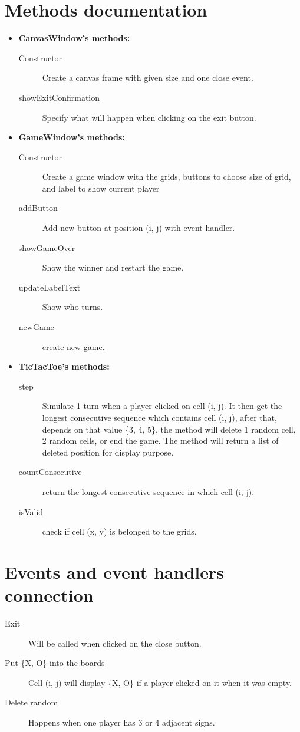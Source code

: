\documentclass[a4paper, 12pt]{report}
\begin{document}
\chapter{Methods documentation}
\begin{itemize}
\item \textbf{CanvasWindow's methods:}
		\begin{description}
			\item[Constructor] Create a canvas frame with given size and one close event.
			\item[showExitConfirmation] Specify what will happen when clicking on the exit button.
		\end{description}
\item \textbf{GameWindow's methods:}
		\begin{description}
			\item[Constructor] Create a game window with the grids, buttons to choose size of grid, and label to show current player
			\item[addButton] Add new button at position (i, j) with event handler.
			\item[showGameOver] Show the winner and restart the game.
			\item[updateLabelText] Show who turns.
			\item[newGame] create new game.
		\end{description}
\item \textbf{TicTacToe's methods:}
		\begin{description}
			\item[step] Simulate 1 turn when a player clicked on cell (i, j). It then get the longest consecutive sequence which contains cell (i, j), after that, depends on that value \{3, 4, 5\}, the method will delete 1 random cell, 2 random cells, or end the game. The method will return a list of deleted position for display purpose.
			\item[countConsecutive] return the longest consecutive sequence in which cell (i, j).
			\item[isValid] check if cell (x, y) is belonged to the grids.
		\end{description}
\end{itemize}
\chapter{Events and event handlers connection}
\begin{description}
	\item[Exit] Will be called when clicked on the close button.
	\item[Put \{X, O\} into the boards] Cell (i, j) will display \{X, O\} if a player clicked on it when it was empty.
	\item[Delete random] Happens when one player has 3 or 4 adjacent signs.
\end{description}
\end{document}
